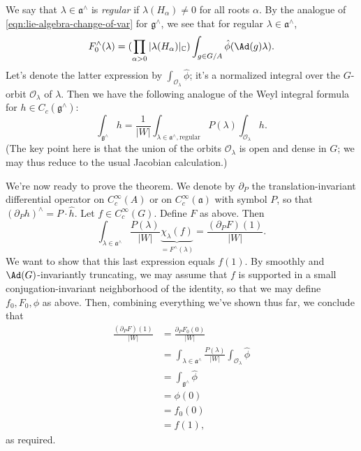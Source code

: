 \documentclass[reqno]{amsart} 
\begin{document}
We say that $\lambda \in \mathfrak{a}^\wedge$ is \emph{regular} if $\lambda(H_\alpha) \neq 0$ for all roots $\alpha$.  By the analogue of \eqref{eqn:lie-algebra-change-of-var} for $\mathfrak{g}^\wedge$, we see that for regular $\lambda \in \mathfrak{a}^\wedge$,
\begin{equation*}
  F_0^\wedge(\lambda)
  = (\prod_{\alpha > 0}
  |\lambda(H_\alpha)|_{\mathbb{C}})
  \int_{g \in G/A}
  \hat{\phi}(\Ad(g) \lambda).
\end{equation*}
Let's denote the latter expression by $\int_{\mathcal{O}_\lambda} \hat{\phi}$; it's a normalized integral over the $G$-orbit $\mathcal{O}_\lambda$ of $\lambda$.  Then we have the following analogue of the Weyl integral formula for $h \in C_c(\mathfrak{g}^\wedge)$:
\begin{equation*}
  \int_{\mathfrak{g}^\wedge}
  h
  = \frac{1}{|W|}
  \int_{\lambda \in \mathfrak{a}^\wedge,\text{regular}}
  P(\lambda)
  \int_{\mathcal{O}_\lambda} h.
\end{equation*}
(The key point here is that the union of the orbits $\mathcal{O}_\lambda$ is open and dense in $G$; we may thus reduce to the usual Jacobian calculation.)

We're now ready to prove the theorem.  We denote by $\partial_P$ the translation-invariant differential operator on $C_c^\infty(A)$ or on $C_c^\infty(\mathfrak{a})$ with symbol $P$, so that $(\partial_P h)^\wedge = P \cdot \hat{h}$.  Let $f \in C_c^\infty(G)$.  Define $F$ as above.  Then
\begin{equation*}
  \int_{\lambda \in \mathfrak{a}^\wedge}
  \frac{P(\lambda)}{|W|}
  \underbrace{\chi_\lambda(f)}_{=F^\wedge(\lambda)}
  =
  \frac{(\partial_P F)(1)}{|W|}.
\end{equation*}
We want to show that this last expression equals $f(1)$.  By smoothly and $\Ad(G)$-invariantly truncating, we may assume that $f$ is supported in a small conjugation-invariant neighborhood of the identity, so that we may define $f_0,F_0,\phi$ as above.  Then, combining everything we've shown thus far, we conclude that
\begin{align*}
  \frac{(\partial_P F)(1)}{|W|}
  &=
    \frac{\partial_P F_0(0)}{|W|}
  \\
  &=
    \int_{\lambda \in \mathfrak{a}^\wedge}
    \frac{P(\lambda)}{|W|}
    \int_{\mathcal{O}_\lambda}
    \hat{\phi}
  \\
  &= \int_{\mathfrak{g}^\wedge}
    \hat{\phi}
  \\
  &=
    \phi(0)
  \\
  &= f_0(0)
  \\
  &= f(1),
\end{align*}
as required.
\end{document}
